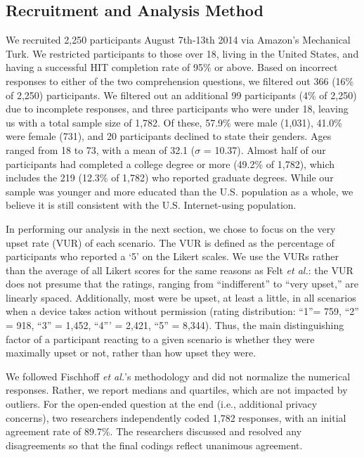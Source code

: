 \subsection{Recruitment and Analysis Method}
We recruited 2,250 participants August 7th-13th 2014 via Amazon's Mechanical Turk. We restricted participants to those over 18, living in the United States, and having a successful HIT completion rate of 95\% or above. Based on incorrect responses to either of the two comprehension questions, we filtered out 366 (16\% of 2,250) participants. We filtered out an additional 99 participants (4\% of 2,250) due to incomplete responses, and three participants who were under 18, leaving us with a total sample size of 1,782. Of these, 57.9\% were male (1,031), 41.0\% were female (731), and 20 participants declined to state their genders. Ages ranged from 18 to 73, with a mean of 32.1 ($\sigma$ = 10.37). Almost half of our participants had completed a college degree or more (49.2\% of 1,782), which includes the 219 (12.3\% of 1,782) who reported graduate degrees. While our sample was younger and more educated than the U.S. population as a whole, we believe it is still consistent with the U.S. Internet-using population.

In performing our analysis in the next section, we chose to focus on the very upset rate (VUR) of each scenario.  The VUR is defined as the percentage of participants who reported a `5' on the Likert scales. 
We use the VURs rather than the average of all Likert scores for the same reasons as Felt {\it et al.}: the VUR does not presume that the ratings, ranging from ``indifferent'' to ``very upset,'' are linearly spaced. Additionally, most were be upset, at least a little, in all scenarios when a device takes action without permission (rating distribution: ``1''= 759, ``2'' = 918, ``3'' = 1,452, ``4''' = 2,421, ``5'' = 8,344). Thus, the main distinguishing factor of a participant reacting to a given scenario is whether they were maximally upset or not, rather than how upset they were.

We followed Fischhoff {\it et al.}'s methodology and did not normalize the numerical responses. Rather, we report medians and quartiles, which are not impacted by outliers. For the open-ended question at the end (i.e., additional privacy concerns), two researchers independently coded 1,782 responses, with an initial agreement rate of 89.7\%. The researchers discussed and resolved any disagreements so that the final codings reflect unanimous agreement.